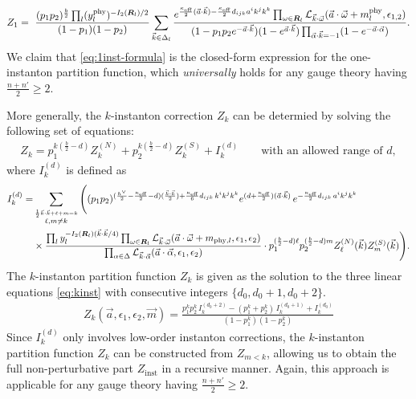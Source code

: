 \documentclass[letterpaper, 11pt]{article}
\newcommand{\nn}{\nonumber}
\def\CL{{\cal L}}
\def\a{\alpha}
\def\e{\epsilon}
\def\k{\kappa}
\def\w{\omega}
\def\D{\Delta}
\begin{document}
{\begin{align}
  Z_1=\ \frac{(p_1p_2)^{\frac{b}{2}}\prod_{l}(y_{l}^{\text{phy}})^{-{I_2(\boldsymbol{R}_l)}/{2}}}{(1-p_1)(1-p_2)} \sum_{\vec{k}\in\Delta_l}\frac{e^{\frac{\kappa_{\text{eff}}}{2}(\vec{a}\cdot\vec{k})-\frac{\kappa_{\text{eff}}}{2}d_{ijk}a^ik^jk^k}\prod_{\w \in \boldsymbol{R}_l} \CL_{\vec{k}\cdot\vec{\w}}(\vec{a}\cdot \vec{\w} + m_{l}^\text{phy}, \e_{1,2})}{(1-p_1p_2e^{-\vec{a}\cdot\vec{k}})(1-e^{\vec{a}\cdot\vec{k}})\prod_{\vec{\alpha}\cdot \vec{k}=-1}(1-e^{-\vec{a}\cdot\vec{\alpha}})}.
\end{align}
We claim that \eqref{eq:1inst-formula} is the closed-form expression for the one-instanton partition function, which \emph{universally} holds for any gauge theory having $\frac{n+n'}{2} \geq 2$.

More generally, the $k$-instanton correction $Z_k$ can be determied by solving the following set of equations:
\begin{align}
  \label{eq:kinst}
  Z_k = p_1^{k(\frac{b}{2}-d)}Z^{(N)}_{k}  + p_2^{k(\frac{b}{2}-d)}  Z^{(S)}_k  + I_k^{(d)} \qquad \text{with an allowed range of $d$},
\end{align}
where $I_{k}^{(d)}$ is defined as
\begin{align}
  I_{k}^{(d)} = &\sum_{\stackrel{\frac{1}{2}\vec{k}\cdot\vec{k} + \ell + m = k}{\ell, m \neq k}}  
  \Bigg( (p_1p_2)^{(\frac{h^\vee}{2} - \frac{\kappa_\text{eff}}{2}-d) (\frac{\vec{k}\cdot\vec{k}}{2}) +\frac{\k_\text{eff}}{6}d_{ijk}\,k^ik^jk^k} e^{(d+\frac{\k_\text{eff}}{2})(\vec{a}\cdot\vec{k})}\,
 e^{-\frac{\k_\text{eff}}{2}d_{ijk}\,a^ik^jk^k} \\& 
 \times    \frac{\prod_{l} y_l^{-I_2(\boldsymbol{R}_l)(\vec{k}\cdot\vec{k}/4)} \prod_{\w \in \boldsymbol{R}_l} \CL_{\vec{k}\cdot\vec{\w}}(\vec{a}\cdot \vec{\w} + m_{\text{phy},l}, \e_1,\e_2)}{ \prod_{\a \in \D} \CL_{\vec{k} \cdot \vec{\a}} (\vec{a}\cdot\vec{\alpha}, \epsilon_1, \epsilon_2)}
 \cdot p_1^{(\frac{b}{2}-d)\ell}p_2^{(\frac{b}{2}-d)m}Z^{(N)}_{\ell}(\vec{k})  Z^{(S)}_m (\vec{k}) \Bigg) \nn.
\end{align}
The $k$-instanton partition function $Z_k$ is given as the solution to the three linear equations \eqref{eq:kinst} with consecutive integers $\{d_0, d_0+1, d_0+2\}$.
\begin{align}
  Z_k(\vec{a},\e_1,\e_2, \vec{m})=\frac{p_1^k p_2^k \,I_{k}^{(d_0+2)}-(p_1^k+p_2^k)\,I_{k}^{(d_0+1)}+I_{k}^{(d_0)}}{(1-p_1^k)(1-p_2^k)}
\end{align}
Since $I_k^{(d)}$ only involves low-order instanton corrections, the $k$-instanton partition function $Z_k$ can be constructed from $Z_{m<k}$, allowing us to obtain the full non-perturbative part $Z_\text{inst}$ in a recursive manner. Again, this approach is applicable for any gauge theory having $\frac{n+n'}{2} \geq 2$.



}
\end{document}
